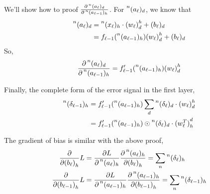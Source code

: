 \documentclass[12pt,a4paper]{article}%
\theoremstyle{definition}
\theoremstyle{plain}
\numberwithin{equation}{section}
\begin{document}
We'll show how to proof $\frac{\partial \prescript{n}{}{(a_{\ell})}_{d}}{\partial \prescript{n}{}{(a_{\ell-1})}_{h}}$. For $ \prescript{n}{}{(a_{\ell})}_{d}   $, we know that 
\begin{align*}
\prescript{n}{}{(a_{\ell})}_{d} &= \prescript{n}{}{(x_{\ell})}_{h} \cdot {(w_{\ell})}^{h}_{d}  + (b_{\ell})_{d} \\
													  &= f_{\ell-1}(\prescript{n}{}{(a_{\ell-1})}_{h}) {(w_{\ell})}^{h}_{d} + (b_{\ell})_{d}
\end{align*}
So,
\begin{equation}
\frac{\partial \prescript{n}{}{(a_{\ell})}_{d}}{\partial \prescript{n}{}{(a_{\ell-1})}_{h}} = f'_{\ell-1}(\prescript{n}{}{(a_{\ell-1})}_{h}) {(w_{\ell})}^{h}_{d} 
\end{equation}

Finally, the complete form of the error signal in the first layer,
\begin{align*}
\prescript{n}{}{(\delta_{\ell-1})}_{h} &= f'_{\ell-1}(\prescript{n}{}{(a_{\ell-1})}_{h}) \sum\limits_{d} 	\prescript{n}{}{(\delta_{\ell})}_{d} \cdot  {(w_{\ell})}^{h}_{d} \\
																  &= f'_{\ell-1}(\prescript{n}{}{(a_{\ell-1})}_{h}) \odot \prescript{n}{}{(\delta_{\ell})}_{d} \cdot {(w_{\ell}^{T})}^{d}_{h}
\end{align*}

The gradient of bias is similar with the above proof,
\begin{align*}
\frac{\partial}{\partial {(b_{\ell})}_{h}} L  &= \frac{\partial L}{\partial \prescript{n}{}{(a_{\ell})}_{h}} \frac{\partial \prescript{n}{}{(a_{\ell})}_{h}}{\partial {(b_{\ell})}_{h}} = \sum\limits_{n} \prescript{n}{}{(\delta_{\ell})}_{h} \\
\frac{\partial}{\partial {(b_{\ell-1})}_{h}} L  &= \frac{\partial L}{\partial \prescript{n}{}{(a_{\ell-1})}_{h}} \frac{\partial \prescript{n}{}{(a_{\ell-1})}_{h}}{\partial {(b_{\ell-1})}_{h}} = \sum\limits_{n} \prescript{n}{}{(\delta_{\ell-1})}_{h}
\end{align*}
\end{document}
